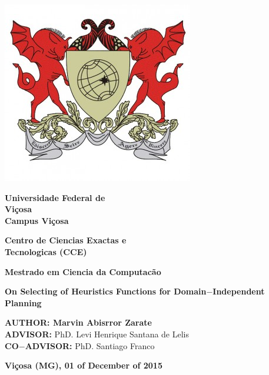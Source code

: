 \pagestyle{empty}
\begin{center}
\begin{center}
\includegraphics[scale=0.45]{images/ufv_escudo}
\end{center}
\vspace{15 pt}
\renewcommand{\baselinestretch}{1.0}
\Huge
\textbf{Universidade Federal de\\Vi\c{c}osa}\\
\LARGE
\textbf{Campus Vi\c{c}osa}\\
\vspace{10 pt}

\Large
\textbf{Centro de Ciencias Exactas e\\ Tecnologicas (CCE)}\\
\vspace{20 pt}

\textbf{Mestrado em Ciencia da Computac\~ao}\\
\vspace{35 pt}

\Huge
\textbf{On Selecting of Heuristics Functions for Domain$-$Independent Planning}\\
\vspace{50 pt}

\Large
\begin{flushleft}
\hspace{5pt}\textbf{AUTHOR: \hspace{4pt}Marvin Abisrror Zarate}\\
\vspace{5pt}
\hspace{5pt}\textbf{ADVISOR:} PhD. Levi Henrique Santana de Lelis \\
\hspace{5pt}\textbf{CO$-$ADVISOR:} PhD. Santiago Franco \\
\end{flushleft}

\large
\vspace{15pt}
\textbf{Vi\c{c}osa (MG), 01 of December of 2015}
\end{center}
\clearpage

\renewcommand{\baselinestretch}{1.5}